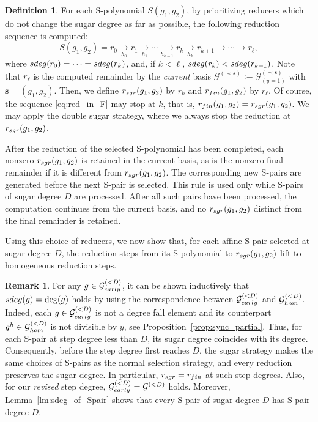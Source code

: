 \documentclass{article}
\theoremstyle{definition}
\newtheorem{definition}[theorem]{Definition}
\newtheorem{remark}[theorem]{Remark}
\theoremstyle{plain}
\theoremstyle{plain}
\theoremstyle{plain}
\theoremstyle{plain}
\numberwithin{equation}{subsection}
\begin{document}
\begin{definition}\label{def:r(g1,g2)}
For each S-polynomial $S(g_1,g_2)$, by prioritizing reducers which do not change the sugar degree as far as possible, the following reduction sequence is computed:
\begin{equation}\label{eq:red_in_F}
S(g_1,g_2)=r_0
\underset{h_0}{\longrightarrow} r_1\underset{h_1}{\longrightarrow} \cdots
\underset{h_{k-1}}{\longrightarrow}r_k\underset{h_{k}}{\longrightarrow}r_{k+1}
\longrightarrow \cdots \longrightarrow r_\ell, 
\end{equation}
where ${\rm sdeg}(r_0)=\cdots={\rm sdeg}(r_k)$, and, if $k<\ell$, ${\rm sdeg}(r_k)< {\rm sdeg}(r_{k+1})$.
Note that $r_\ell$ is the computed remainder by the {\em current} basis $\mathcal{G}^{(\prec \bm{s})}:=\mathcal{G}_{(y=1)}^{(\prec \bm{s})}$ with $\bm{s} =(g_1,g_2)$.
Then, we define $r_{\rm sgr}(g_1,g_2)$ by $r_k$ and $r_{\rm fin}(g_1,g_2)$ by $r_\ell$. 
Of course, the sequence \eqref{eq:red_in_F} may stop at $k$, that is, $r_{\rm fin}(g_1,g_2)=r_{\rm sgr}(g_1,g_2)$. 
We may apply the double sugar strategy, where we always stop the reduction at $r_{\rm sgr}(g_1,g_2)$.
\end{definition}

After the reduction of the selected S-polynomial has been completed, each nonzero $r_{\rm sgr}(g_1,g_2)$ is retained in the current basis, as is the nonzero final remainder if it is different from $r_{\rm sgr}(g_1,g_2)$.
The corresponding new S-pairs are generated before the next S-pair is selected.
This rule is used only while S-pairs of sugar degree $D$ are processed.
After all such pairs have been processed, the computation continues from the current basis, and no $r_{\rm sgr}(g_1,g_2)$ distinct from the final remainder is retained.

Using this choice of reducers, we now show that, for each affine S-pair selected at sugar degree $D$, the reduction steps from its S-polynomial to $r_{\rm sgr}(g_1,g_2)$ lift to homogeneous reduction steps.

\begin{remark}\label{rm:falldegree}
For any $g\in \mathcal{G}_{\rm early}^{(<D)}$, it can be shown inductively that ${\rm sdeg}(g)=\deg(g)$ holds by using the correspondence between $\mathcal{G}_{\rm early}^{(<D)}$ and $\mathcal{G}_{\rm hom}^{(<D)}$.
Indeed, each $g\in \mathcal{G}_{\rm early}^{(<D)}$ is not a degree fall element and its counterpart $g^h\in \mathcal{G}_{\rm hom}^{(<D)}$ is not divisible by $y$, see Proposition~\ref{prop:sync_partial}. 
Thus, for each S-pair at step degree less than $D$, its sugar degree coincides with its degree.
Consequently, before the step degree first reaches $D$, the sugar strategy makes the same choices of S-pairs as the normal selection strategy, and every reduction preserves the sugar degree.
In particular, $r_{\rm sgr}=r_{\rm fin}$ at such step degrees.
Also, for our {\em revised} step degree, $\mathcal{G}_{\rm early}^{(<D)}=\mathcal{G}^{(<D)}$ holds.
Moreover, Lemma~\ref{lm:sdeg_of_Spair} shows that every S-pair of sugar degree $D$ has S-pair degree $D$.
\end{remark}
\end{document}
